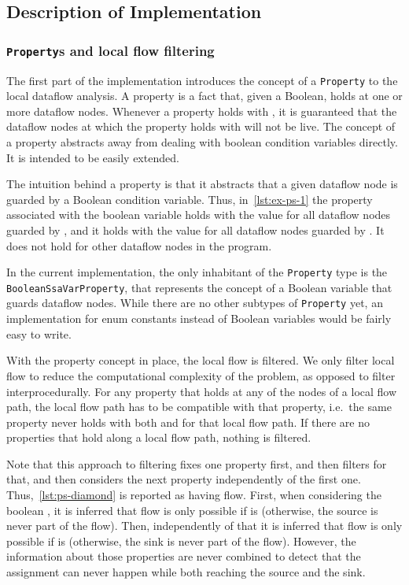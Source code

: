 \subsection{Description of Implementation}
\subsubsection*{\texttt{Property}s and local flow filtering}
The first part of the implementation introduces the concept of a \texttt{Property}
to the local dataflow analysis.
A property is a fact that, given a Boolean, holds at one or more dataflow nodes.
Whenever a property holds with , it is guaranteed that the dataflow nodes 
at which the property holds with  will not be live.
The concept of a property abstracts away from dealing with boolean condition variables
directly. It is intended to be easily extended.

The intuition behind a property is that it abstracts that a given 
dataflow node is guarded by a Boolean condition variable.
Thus, in~\autoref{lst:ex-ps-1} the property associated with the boolean variable 
holds with the value  for all dataflow nodes guarded by
, and it holds with the value  for all dataflow nodes 
guarded by .
It does not hold for other dataflow nodes in the program.

In the current implementation, the only inhabitant of the \texttt{Property}
type is the \texttt{BooleanSsaVarProperty}, that represents the concept of
a Boolean variable that guards dataflow nodes.
While there are no other subtypes of \texttt{Property} yet, an implementation
for enum constants instead of Boolean variables would be fairly easy to write.

With the property concept in place, the local flow 
is filtered.
We only filter local flow to reduce the computational complexity of the problem,
as opposed to filter interprocedurally.
For any property that holds at any of the nodes of a local flow path,
the local flow path has to be compatible with that property, i.e.\ the same 
property never holds with both  and  for that local flow path.
If there are no properties that hold along a local flow path, nothing is filtered.

Note that this approach to filtering fixes one property first, and then filters 
for that, and then considers the next property independently of the first one.
Thus,~\autoref{lst:ps-diamond} is reported as having flow.
First, when considering the boolean , it is inferred that flow is only 
possible if  is  
(otherwise, the source is never part of the flow).
Then, independently of that it is inferred that flow is only possible if 
is  (otherwise, the sink is never part of the flow).
However, the information about those properties are never combined to detect 
that the assignment  can never happen while both reaching the 
source and the sink.

